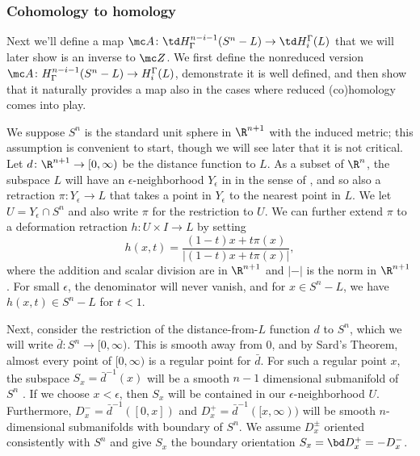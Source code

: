 \begin{example}
\subsubsection{Cohomology to homology}
Next we'll define a map $\mc A \colon \td H^{n-i-1}_\Gamma(S^n-L) \to \td H_i^\Gamma(L)$ that we will later show is an inverse to $\mc Z$.
We first define the nonreduced version $\mc A \colon H^{n-i-1}_\Gamma(S^n-L) \to H_i^\Gamma(L)$, demonstrate it is well defined, and then show that it naturally provides a map also in the cases where reduced (co)homology comes into play.

We suppose $S^n$ is the standard unit sphere in $\R^{n+1}$ with the induced metric; this assumption is convenient to start, though we will see later that it is not critical.
Let $d \colon \R^{n+1} \to [0,\infty)$ be the distance function to $L$.
As a subset of $\R^n$, the subspace $L$ will have an $\epsilon$-neighborhood $Y_\epsilon$ in in the sense of \cite[Section 2.3]{GuPo74}, and so also a retraction $\pi \colon Y_\epsilon \to L$ that takes a point in $Y_\epsilon$ to the nearest point in $L$.
We let $U = Y_\epsilon \cap S^n$ and also write $\pi$ for the restriction to $U$.
We can further extend $\pi$ to a deformation retraction $h \colon U \times I \to L$ by setting
\begin{equation}\label{E: alex retraction}
h(x,t) = \frac{(1-t)x + t\pi(x)}{|(1-t)x + t\pi(x)|},
\end{equation}
where the addition and scalar division are in $\R^{n+1}$ and $|-|$ is the norm in $\R^{n+1}$.
For small $\epsilon$, the denominator will never vanish, and for $x \in S^n -L$, we have $h(x,t) \in S^n -L$ for $t < 1$.

Next, consider the restriction of the distance-from-$L$ function $d$ to $S^n$, which we will write $\bar d \colon S^n \to [0,\infty)$.
This is smooth away from $0$, and by Sard's Theorem, almost every point of $[0,\infty)$ is a regular point for $\bar d$.
For such a regular point $x$, the subspace $S_x = \bar d^{-1}(x)$ will be a smooth $n-1$ dimensional submanifold of $S^n$ \cite[Section 2.1]{GuPo74}.
If we choose $x < \epsilon$, then $S_x$ will be contained in our $\epsilon$-neighborhood $U$.
Furthermore, $D_x^- = \bar d^{-1}([0,x])$ and $D_x^+ = \bar d^{-1}([x,\infty))$ will be smooth $n$-dimensional submanifolds with boundary of $S^n$.
We assume $D^{\pm}_x$ oriented consistently with $S^n$ and give $S_x$ the boundary orientation $S_x = \bd D_x^+ = -D_x^-$.


\begin{comment}
	Recall that we assume the components $L_i$ of $L$ have pairwise disjoint tubular neighborhoods $U_i$.
	We identify these neighborhoods with normal bundles that we may further assume have been given smooth Riemannian bundle metrics.
	This allows us to identify sphere bundles $S_a$ and the disk bundles $D_a$ consisting respectively of the elements of length $a$ or $\leq a$ in each Euclidean fiber.
	Identifying the normal bundles with $U_i$, we think of the $S_a$ as smooth $n-1$ dimensional submanifolds of $S^n$ and of the $D_a$ as smooth $n$-dimensional submanifolds with boundary.
	We can take $D_a$ to be oriented consistently with $S^n$ and let $S_a$ have the boundary orientation.


\end{comment}
\end{example}
